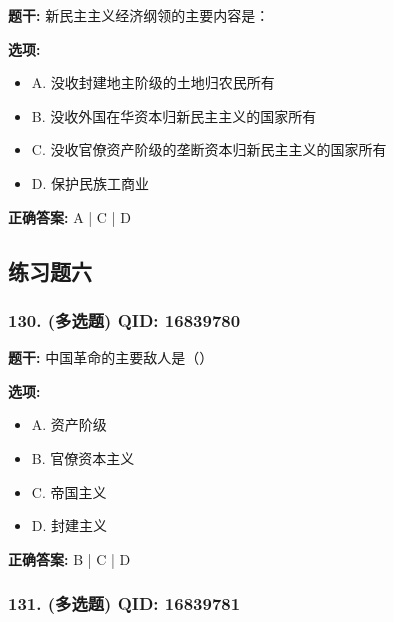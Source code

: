 \documentclass[12pt,UTF8]{ctexart}
\begin{document}
\textbf{题干:}
新民主主义经济纲领的主要内容是：

\textbf{选项:}
\begin{itemize}[leftmargin=*]

  \item A. 没收封建地主阶级的土地归农民所有

  \item B. 没收外国在华资本归新民主主义的国家所有

  \item C. 没收官僚资产阶级的垄断资本归新民主主义的国家所有

  \item D. 保护民族工商业

\end{itemize}

\textbf{正确答案:}
A | C | D

\vspace{0.3em}\hrulefill\vspace{0.7em}

\subsection*{练习题六}

\subsubsection*{130. (多选题) \small QID: 16839780}

\textbf{题干:}
中国革命的主要敌人是（）

\textbf{选项:}
\begin{itemize}[leftmargin=*]

  \item A. 资产阶级

  \item B. 官僚资本主义

  \item C. 帝国主义

  \item D. 封建主义

\end{itemize}

\textbf{正确答案:}
B | C | D

\vspace{0.3em}\hrulefill\vspace{0.7em}

\subsubsection*{131. (多选题) \small QID: 16839781}
\end{document}
